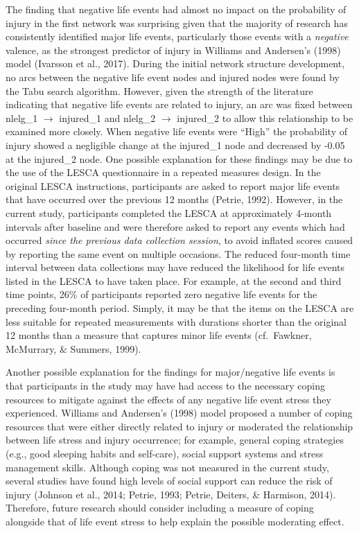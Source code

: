 \documentclass[
  english,
  man,floatsintext]{apa6}
\begin{document}
The finding that negative life events had almost no impact on the probability of injury in the first network was surprising given that the majority of research has consistently identified major life events, particularly those events with a \emph{negative} valence, as the strongest predictor of injury in Williams and Andersen's (1998) model (Ivarsson et al., 2017).
During the initial network structure development, no arcs between the negative life event nodes and injured nodes were found by the Tabu search algorithm.
However, given the strength of the literature indicating that negative life events are related to injury, an arc was fixed between nlelg\_1 \(\rightarrow\) injured\_1 and nlelg\_2 \(\rightarrow\) injured\_2 to allow this relationship to be examined more closely.
When negative life events were \enquote{High} the probability of injury showed a negligible change at the injured\_1 node and decreased by -0.05 at the injured\_2 node.
One possible explanation for these findings may be due to the use of the LESCA questionnaire in a repeated measures design.
In the original LESCA instructions, participants are asked to report major life events that have occurred over the previous 12 months (Petrie, 1992).
However, in the current study, participants completed the LESCA at approximately 4-month intervals after baseline and were therefore asked to report any events which had occurred \emph{since the previous data collection session}, to avoid inflated scores caused by reporting the same event on multiple occasions.
The reduced four-month time interval between data collections may have reduced the likelihood for life events listed in the LESCA to have taken place.
For example, at the second and third time points, 26\% of participants reported zero negative life events for the preceding four-month period.
Simply, it may be that the items on the LESCA are less suitable for repeated measurements with durations shorter than the original 12 months than a measure that captures minor life events (cf.~Fawkner, McMurrary, \& Summers, 1999).

Another possible explanation for the findings for major/negative life events is that participants in the study may have had access to the necessary coping resources to mitigate against the effects of any negative life event stress they experienced.
Williams and Andersen's (1998) model proposed a number of coping resources that were either directly related to injury or moderated the relationship between life stress and injury occurrence; for example, general coping strategies (e.g., good sleeping habits and self-care), social support systems and stress management skills.
Although coping was not measured in the current study, several studies have found high levels of social support can reduce the risk of injury (Johnson et al., 2014; Petrie, 1993; Petrie, Deiters, \& Harmison, 2014).
Therefore, future research should consider including a measure of coping alongside that of life event stress to help explain the possible moderating effect.
\end{document}
